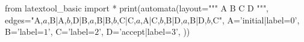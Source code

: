 from latextool_basic import *
print(automata(layout="""
A  B   C  D
""",
edges="A,$a$,B|A,$b$,D|B,$a$,B|B,$b$,C|C,$a$,A|C,$b$,B|D,$a$,B|D,$b$,C",
A='initial|label=$0$',
B='label=$1$',
C='label=$2$',
D='accept|label=$3$',
))
